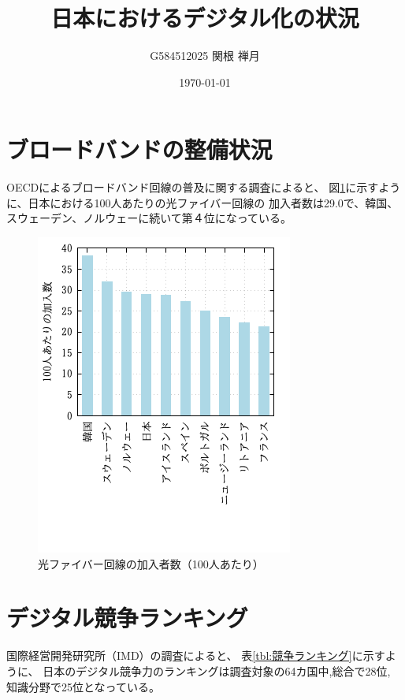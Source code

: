 \documentclass[a4paper,11pt,dvipdfmx]{ujarticle}
\title{日本におけるデジタル化の状況}
\date{\today}
\author{G584512025 関根 禅月}
\begin{document}
\maketitle %

\section{ブロードバンドの整備状況}

OECDによるブロードバンド回線の普及に関する調査\cite{oecd}によると、
図\ref{fig:imd}に示すように、日本における100人あたりの光ファイバー回線の
加入者数は29.0で、韓国、スウェーデン、ノルウェーに続いて第４位になっている。
\begin{figure}[htbp]
    \centering
    \includegraphics[width=0.6\linewidth]{hikari.png}
    \caption{光ファイバー回線の加入者数（100人あたり）}\label{fig:imd}
\end{figure}
\section{デジタル競争ランキング}
国際経営開発研究所（IMD）の調査\cite{imd}によると、
表\ref{tbl:競争ランキング}に示すように、
日本のデジタル競争力のランキングは調査対象の64カ国中,総合で28位,
知識分野で25位となっている。
\end{document}
